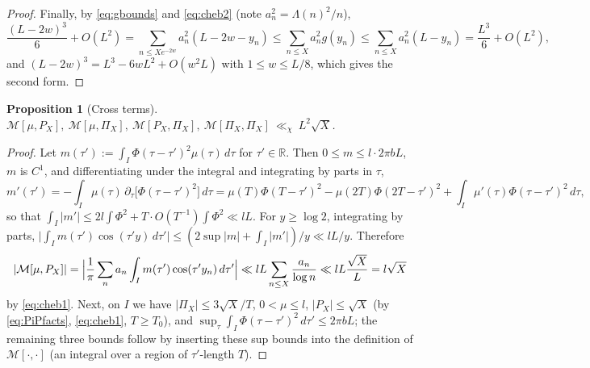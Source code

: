 \documentclass[11pt]{amsart}
\newtheorem{proposition}[theorem]{Proposition}
\theoremstyle{definition}
\theoremstyle{remark}
\numberwithin{equation}{section}
\newcommand{\RR}{\mathbb{R}}
\newcommand{\dd}{\,d}
\begin{document}
\begin{proof}
Finally, by \eqref{eq:gbounds} and \eqref{eq:cheb2} (note $a_n^2=\Lambda(n)^2/n$),
\[
\frac{(L-2w)^3}6+O(L^2)=\!\!\sum_{n\le Xe^{-2w}}\!\!a_n^2(L-2w-y_n)\le\sum_{n\le X}a_n^2g(y_n)\le\sum_{n\le X}a_n^2(L-y_n)=\frac{L^3}6+O(L^2),
\]
and $(L-2w)^3=L^3-6wL^2+O(w^2L)$ with $1\le w\le L/8$, which gives the second form.
\end{proof}

\begin{proposition}[Cross terms]\label{prop:cross}
$\mathcal M[\mu,P_X],\ \mathcal M[\mu,\Pi_X],\ \mathcal M[P_X,\Pi_X],\ \mathcal M[\Pi_X,\Pi_X]\ \ll_\chi\ L^2\sqrt X$.
\end{proposition}
\begin{proof}
Let $m(\tau'):=\int_I\Phi(\tau-\tau')^2\mu(\tau)\dd\tau$ for $\tau'\in\RR$. Then $0\le m\le l\cdot2\pi bL$, $m$ is $C^1$, and differentiating under the integral and integrating by parts in $\tau$,
\[
m'(\tau')=-\int_I\mu(\tau)\,\partial_\tau\bigl[\Phi(\tau-\tau')^2\bigr]\dd\tau=\mu(T)\Phi(T-\tau')^2-\mu(2T)\Phi(2T-\tau')^2+\int_I\mu'(\tau)\Phi(\tau-\tau')^2\dd\tau,
\]
so that $\int_I|m'|\le 2l\int\Phi^2+T\cdot O(T^{-1})\int\Phi^2\ll lL$. For $y\ge\log2$, integrating by parts,
$\bigl|\int_Im(\tau')\cos(\tau'y)\dd\tau'\bigr|\le(2\sup|m|+\int_I|m'|)/y\ll lL/y$. Therefore
\[
|\mathcal M[\mu,P_X]|=\Bigl|\frac1\pi\sum_na_n\int_Im(\tau')\cos(\tau'y_n)\dd\tau'\Bigr|\ll lL\sum_{n\le X}\frac{a_n}{\log n}\ll lL\frac{\sqrt X}{L}=l\sqrt X
\]
by \eqref{eq:cheb1}. Next, on $I$ we have $|\Pi_X|\le3\sqrt X/T$, $0<\mu\le l$, $|P_X|\le\sqrt X$ (by \eqref{eq:PiPfacts}, \eqref{eq:cheb1}, $T\ge T_0$), and $\sup_{\tau}\int_I\Phi(\tau-\tau')^2\dd\tau'\le2\pi bL$; the remaining three bounds follow by inserting these sup bounds into the definition of $\mathcal M[\cdot,\cdot]$ (an integral over a region of $\tau'$-length $T$).
\end{proof}
\end{document}
